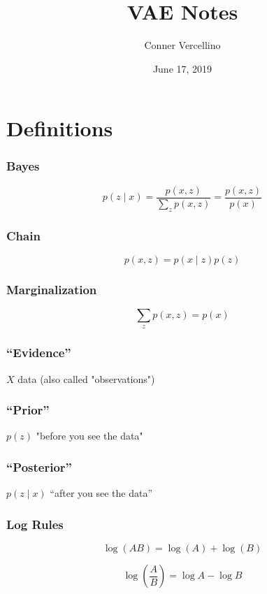 \documentclass{article}
\title{VAE Notes}
\author{Conner Vercellino}
\date{June 17, 2019}
\begin{document}
\maketitle
\section*{Definitions}

\subsubsection*{Bayes}

\[
p(z \mid x) = \frac{p(x, z)}{\sum_{z} p(x, z)} = \frac{p(x, z)}{p(x)}
\]

\subsubsection*{Chain}

\[
p(x, z) = p(x \mid z) p(z)
\]

\subsubsection*{Marginalization}

\[
\sum_{z} p(x, z) = p(x)
\]

\subsubsection*{``Evidence''}

$X$ data (also called "observations")

\subsubsection*{``Prior''}

$p(z)$ "before you see the data"

\subsubsection*{``Posterior''}

$p(z \mid x)$ ``after you see the data''

\subsubsection*{Log Rules}

\[
\log(AB) = \log(A) + \log(B)
\]

\[
\log(\frac{A}{B}) = \log A - \log B
\]
\end{document}

